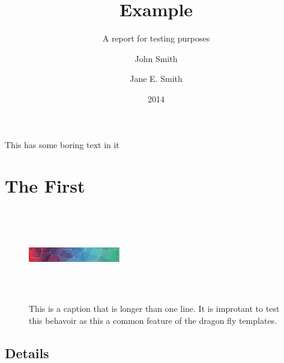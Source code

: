 \documentclass{aebr}
\title{Example}{An Example\\ Report about \emph{sheep} but that also has such
a long title that it actually has to wrap!}
\subtitle{A report for testing purposes}
\date{2014}
\author{John Smith \and Jane E. Smith}
\begin{document}
\maketitle

\tableofcontents

\summary

\citeself

This has some boring text in it



\section{The First}

\lipsum[1]


\begin{figure}[h]
  \includegraphics[width=40mm,height=40mm]{pattern}
  \caption{This is a caption that is longer than one line. It is improtant to test 
  this behavoir as this a common feature of the dragon fly templates.}
\end{figure}

\subsection{Details}

\lipsum[2]
\end{document}
